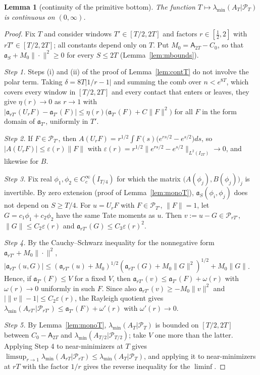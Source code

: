 \documentclass[11pt]{amsart}
\newtheorem{lemma}[theorem]{Lemma}
\theoremstyle{definition}
\theoremstyle{remark}
\newcommand{\PT}{\mathcal P_T}
\newcommand{\lamA}{\lambda_{\min}(A_T|\PT)}
\begin{document}
\begin{lemma}[continuity of the primitive bottom]\label{lem:contA}
The function $T\mapsto\lamA$ is continuous on $(0,\infty)$.
\end{lemma}

\begin{proof}
Fix $T$ and consider windows $T'\in[T/2,2T]$ and factors $r\in[\frac12,2]$ with $rT'\in[T/2,2T]$; all
constants depend only on $T$. Put $M_0=\mathsf A_{2T}-C_0$, so that $\mathfrak a_S+M_0\|\cdot\|^2\ge0$
for every $S\le2T$ (Lemma~\ref{lem:mbounds}).

\emph{Step 1.} Steps (i) and (ii) of the proof of Lemma~\ref{lem:contT} do not involve the polar term.
Taking $\delta=8T|1/r-1|$ and summing the comb over $n<e^{8T}$, which covers every window in
$[T/2,2T]$ and every contact that enters or leaves, they give $\eta(r)\to0$ as $r\to1$ with
$|\mathfrak a_{rT'}(U_rF)-\mathfrak a_{T'}(F)|\le\eta(r)\big(\mathfrak a_{T'}(F)+C\|F\|^2\big)$ for all
$F$ in the form domain of $\mathfrak a_{T'}$, uniformly in $T'$.

\emph{Step 2.} If $F\in\mathcal P_{T'}$, then $A(U_rF)=r^{1/2}\int F(s)\big(e^{rs/2}-e^{s/2}\big)ds$,
so $|A(U_rF)|\le\varepsilon(r)\|F\|$ with $\varepsilon(r)=r^{1/2}\|e^{rs/2}-e^{s/2}\|_{L^2(I_{2T})}\to0$,
and likewise for $B$.

\emph{Step 3.} Fix real $\phi_1,\phi_2\in C_c^\infty(I_{T/4})$ for which the matrix
$\big(A(\phi_j),B(\phi_j)\big)_{j}$ is invertible. By zero extension (proof of Lemma~\ref{lem:monoT}),
$\mathfrak a_S(\phi_i,\phi_j)$ does not depend on $S\ge T/4$. For $u=U_rF$ with $F\in\mathcal P_{T'}$,
$\|F\|=1$, let $G=c_1\phi_1+c_2\phi_2$ have the same Tate moments as $u$. Then
$v:=u-G\in\mathcal P_{rT'}$, $\|G\|\le C_2\varepsilon(r)$ and $\mathfrak a_{rT'}(G)\le C_3\varepsilon(r)^2$.

\emph{Step 4.} By the Cauchy--Schwarz inequality for the nonnegative form
$\mathfrak a_{rT'}+M_0\|\cdot\|^2$,
$|\mathfrak a_{rT'}(u,G)|\le(\mathfrak a_{rT'}(u)+M_0)^{1/2}(\mathfrak a_{rT'}(G)+M_0\|G\|^2)^{1/2}+M_0\|G\|$.
Hence, if $\mathfrak a_{T'}(F)\le V$ for a fixed $V$, then
$\mathfrak a_{rT'}(v)\le\mathfrak a_{T'}(F)+\omega(r)$ with $\omega(r)\to0$ uniformly in such $F$. Since
also $\mathfrak a_{rT'}(v)\ge-M_0\|v\|^2$ and $\big|\|v\|-1\big|\le C_2\varepsilon(r)$, the Rayleigh
quotient gives $\lambda_{\min}(A_{rT'}|\mathcal P_{rT'})\le\mathfrak a_{T'}(F)+\omega'(r)$ with
$\omega'(r)\to0$.

\emph{Step 5.} By Lemma~\ref{lem:monoT}, $\lamA$ is bounded on $[T/2,2T]$ between $C_0-\mathsf A_{2T}$
and $\lambda_{\min}(A_{T/2}|\mathcal P_{T/2})$; take $V$ one more than the latter. Applying Step 4 to
near-minimizers at $T$ gives $\limsup_{r\to1}\lambda_{\min}(A_{rT}|\mathcal P_{rT})\le\lamA$, and applying
it to near-minimizers at $rT$ with the factor $1/r$ gives the reverse inequality for the $\liminf$.
\end{proof}
\end{document}
